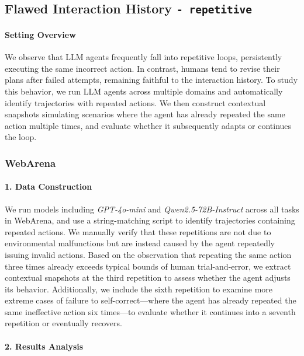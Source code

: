 \subsection{Flawed Interaction History \texttt{- repetitive}}
\paragraph{Setting Overview}
We observe that LLM agents frequently fall into repetitive loops, persistently executing the same incorrect action. In contrast, humans tend to revise their plans after failed attempts, remaining faithful to the interaction history. To study this behavior, we run LLM agents across multiple domains and automatically identify trajectories with repeated actions. We then construct contextual snapshots simulating scenarios where the agent has already repeated the same action multiple times, and evaluate whether it subsequently adapts or continues the loop.

\subsubsection{WebArena}
\paragraph{1. Data Construction}
We run models including \textit{GPT-4o-mini} and \textit{Qwen2.5-72B-Instruct} across all tasks in WebArena, and use a string-matching script to identify trajectories containing repeated actions. We manually verify that these repetitions are not due to environmental malfunctions but are instead caused by the agent repeatedly issuing invalid actions. Based on the observation that repeating the same action three times already exceeds typical bounds of human trial-and-error, we extract contextual snapshots at the third repetition to assess whether the agent adjusts its behavior. Additionally, we include the sixth repetition to examine more extreme cases of failure to self-correct---where the agent has already repeated the same ineffective action six times---to evaluate whether it continues into a seventh repetition or eventually recovers.

\paragraph{2. Results Analysis}

